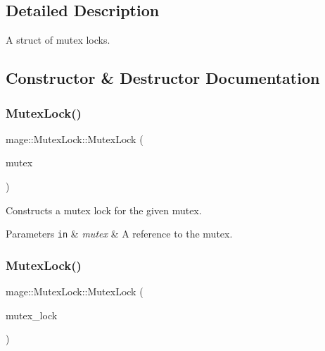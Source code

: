 \subsection{Detailed Description}
A struct of mutex locks. 

\subsection{Constructor \& Destructor Documentation}
\hypertarget{structmage_1_1_mutex_lock_aa8cd93677eec2656ca217fdf79f911c4}{}\label{structmage_1_1_mutex_lock_aa8cd93677eec2656ca217fdf79f911c4} 
\subsubsection{\texorpdfstring{Mutex\+Lock()}{MutexLock()}\hspace{0.1cm}{\footnotesize\ttfamily [1/3]}}
{\footnotesize\ttfamily mage\+::\+Mutex\+Lock\+::\+Mutex\+Lock (\begin{DoxyParamCaption}\item[{\hyperlink{structmage_1_1_mutex}{Mutex} \&}]{mutex }\end{DoxyParamCaption})\hspace{0.3cm}{\ttfamily [explicit]}}

Constructs a mutex lock for the given mutex.


\begin{DoxyParams}[1]{Parameters}
\mbox{\tt in}  & {\em mutex} & A reference to the mutex. \\
\hline
\end{DoxyParams}
\hypertarget{structmage_1_1_mutex_lock_a20b0f44c31bcb2040cbf23f071870af9}{}\label{structmage_1_1_mutex_lock_a20b0f44c31bcb2040cbf23f071870af9} 
\subsubsection{\texorpdfstring{Mutex\+Lock()}{MutexLock()}\hspace{0.1cm}{\footnotesize\ttfamily [2/3]}}
{\footnotesize\ttfamily mage\+::\+Mutex\+Lock\+::\+Mutex\+Lock (\begin{DoxyParamCaption}\item[{const \hyperlink{structmage_1_1_mutex_lock}{Mutex\+Lock} \&}]{mutex\+\_\+lock }\end{DoxyParamCaption})\hspace{0.3cm}{\ttfamily [delete]}}

